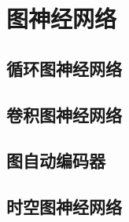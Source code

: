 \section{图神经网络}

\subsection{循环图神经网络}


\subsection{卷积图神经网络}


\subsection{图自动编码器}


\subsection{时空图神经网络}
